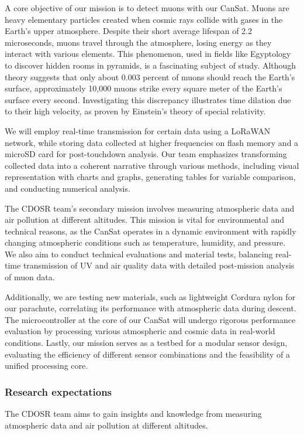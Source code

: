 A core objective of our mission is to detect muons with our CanSat. Muons are heavy elementary particles created when cosmic rays collide with gases in the Earth's upper atmosphere. Despite their short average lifespan of 2.2 microseconds, muons travel through the atmosphere, losing energy as they interact with various elements. This phenomenon, used in fields like Egyptology to discover hidden rooms in pyramids, is a fascinating subject of study. Although theory suggests that only about 0.003 percent of muons should reach the Earth's surface, approximately 10,000 muons strike every square meter of the Earth's surface every second. Investigating this discrepancy illustrates time dilation due to their high velocity, as proven by Einstein’s theory of special relativity.

We will employ real-time transmission for certain data using a LoRaWAN network, while storing data collected at higher frequencies on flash memory and a microSD card for post-touchdown analysis. Our team emphasizes transforming collected data into a coherent narrative through various methods, including visual representation with charts and graphs, generating tables for variable comparison, and conducting numerical analysis.

The CDOSR team's secondary mission involves measuring atmospheric data and air pollution at different altitudes. This mission is vital for environmental and technical reasons, as the CanSat operates in a dynamic environment with rapidly changing atmospheric conditions such as temperature, humidity, and pressure. We also aim to conduct technical evaluations and material tests, balancing real-time transmission of UV and air quality data with detailed post-mission analysis of muon data.

Additionally, we are testing new materials, such as lightweight Cordura nylon for our parachute, correlating its performance with atmospheric data during descent. The microcontroller at the core of our CanSat will undergo rigorous performance evaluation by processing various atmospheric and cosmic data in real-world conditions. Lastly, our mission serves as a testbed for a modular sensor design, evaluating the efficiency of different sensor combinations and the feasibility of a unified processing core.
\subsubsection{Research expectations}

The CDOSR team aims to gain insights and knowledge from measuring atmospheric data and air pollution at different altitudes.

